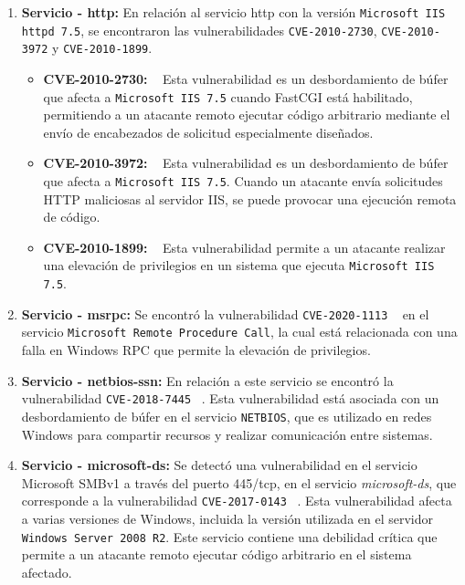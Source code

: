\documentclass[a4paper,12pt]{article} %
\begin{document}
\begin{enumerate}
    \item  \textbf{Servicio - http:} En relación al servicio http con la versión \texttt{Microsoft IIS httpd 7.5}, se encontraron las vulnerabilidades \texttt{CVE-2010-2730}, \texttt{CVE-2010-3972} y \texttt{CVE-2010-1899}. 
    \begin{itemize}
        \item \textbf{CVE-2010-2730: } ~\cite{cve1} Esta vulnerabilidad es un desbordamiento de búfer que afecta a \texttt{Microsoft IIS 7.5} cuando FastCGI está habilitado, permitiendo a un atacante remoto ejecutar código arbitrario mediante el envío de encabezados de solicitud especialmente diseñados.
        \item \textbf{CVE-2010-3972: }  ~\cite{cve2} Esta vulnerabilidad es un desbordamiento de búfer que afecta a \texttt{Microsoft IIS 7.5}. Cuando un atacante envía solicitudes HTTP maliciosas al servidor IIS, se puede provocar una ejecución remota de código.
        \item \textbf{CVE-2010-1899: } ~\cite{cve3} Esta vulnerabilidad permite a un atacante realizar una elevación de privilegios en un sistema que ejecuta \texttt{Microsoft IIS 7.5}.
    \end{itemize}

    \item \textbf{Servicio - msrpc: } Se encontró la vulnerabilidad \texttt{CVE-2020-1113}  ~\cite{cve4}  en el servicio \texttt{Microsoft Remote Procedure Call}, la cual está relacionada con una falla en Windows RPC que permite la elevación de privilegios. 
    
    \item \textbf{Servicio - netbios-ssn: } En relación a este servicio se encontró la vulnerabilidad \texttt{CVE-2018-7445}  ~\cite{cve5}. Esta vulnerabilidad está asociada con un desbordamiento de búfer en el servicio \texttt{NETBIOS}, que es utilizado en redes Windows para compartir recursos y realizar comunicación entre sistemas.
    
    \item  \textbf{Servicio - microsoft-ds: } Se detectó una vulnerabilidad en el servicio Microsoft SMBv1 a través del puerto 445/tcp, en el servicio \textit{microsoft-ds}, que corresponde a la vulnerabilidad \texttt{CVE-2017-0143} ~\cite{cve6}. Esta vulnerabilidad afecta a varias versiones de Windows,  incluida la versión utilizada en el servidor  \texttt{Windows Server 2008 R2}. Este servicio contiene una debilidad crítica que permite a un atacante remoto ejecutar código arbitrario en el sistema afectado.

\end{enumerate}
\end{document}

